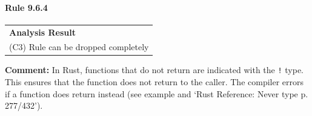 \paragraph{Rule 9.6.4}
\begin{longtable}{p{13cm}}
\textbf{Analysis Result} \\
(C3) Rule can be dropped completely \\
\end{longtable}
\textbf{Comment:} In Rust, functions that do not return are indicated with the \texttt{!} type. This ensures that the function does not return to the caller. The compiler errors if a function does return instead (see example and `Rust Reference: Never type p. 277/432'). \\


